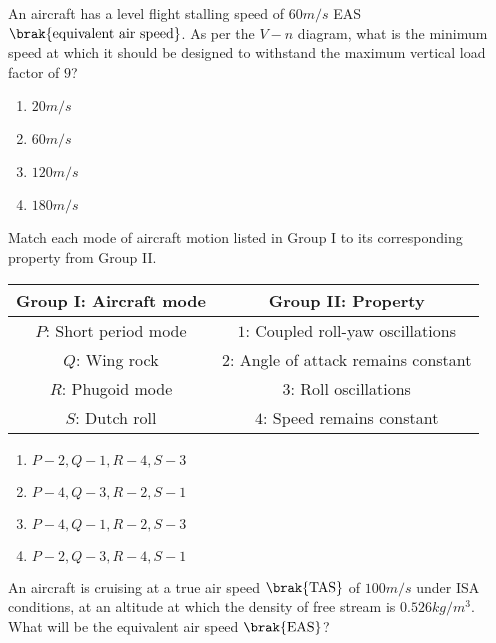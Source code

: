 \iffalse
	\title{Assignment}
	\author{EE24Btech11009}
	\section{ae}
	\chapter{2008}
 \fi
\item An aircraft has a level flight stalling speed of $60  m/s$ EAS $\brak{\text{equivalent air speed}}$. As per the $V-n$ diagram, what is the minimum speed at which it should be designed to withstand the maximum vertical load factor of $9$?
\begin{enumerate}
    \item $20 m/s$
    \item $60 m/s$
    \item $120 m/s$
    \item $180 m/s$
\end{enumerate}
\item Match each mode of aircraft motion listed in Group I to its corresponding property from Group II.
     \begin{tabular}{|c|c|}
    \hline
      Group I: Aircraft mode & Group II: Property\\
      \hline
        $P$: Short period mode& $1$: Coupled roll-yaw oscillations\\
        \hline
        $Q$: Wing rock & $2$: Angle of attack remains constant\\
        \hline
        $R$: Phugoid mode & $3$: Roll oscillations\\
        \hline
        $S$: Dutch roll& $4$: Speed remains constant\\
        \hline
 \end{tabular}
\begin{enumerate}
    \item $P-2, Q-1, R-4, S-3$
    \item $P-4, Q-3, R-2, S-1$
    \item $P-4, Q-1, R-2, S-3$
    \item $P-2, Q-3, R-4, S-1$
\end{enumerate}
\item An aircraft is cruising at a true air speed $\brak{\text{TAS}}$ of $100 m/s$ under ISA conditions, at an altitude at which the density of free stream is $0.526  kg/m^3$. What will be the equivalent air speed $\brak{\text{EAS}}$?
